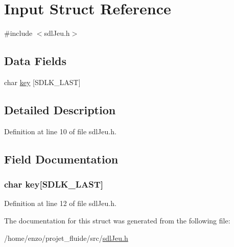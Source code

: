 \hypertarget{struct_input}{\section{Input Struct Reference}
\label{struct_input}
}


{\ttfamily \#include $<$sdl\-Jeu.\-h$>$}

\subsection*{Data Fields}
\begin{DoxyCompactItemize}
\item 
char \hyperlink{struct_input_afc4eabd057bd0061b56de4005f5ecbb8}{key} \mbox{[}S\-D\-L\-K\-\_\-\-L\-A\-S\-T\mbox{]}
\end{DoxyCompactItemize}


\subsection{Detailed Description}


Definition at line 10 of file sdl\-Jeu.\-h.



\subsection{Field Documentation}
\hypertarget{struct_input_afc4eabd057bd0061b56de4005f5ecbb8}{
\subsubsection[{key}]{\setlength{\rightskip}{0pt plus 5cm}char key\mbox{[}S\-D\-L\-K\-\_\-\-L\-A\-S\-T\mbox{]}}}\label{struct_input_afc4eabd057bd0061b56de4005f5ecbb8}


Definition at line 12 of file sdl\-Jeu.\-h.



The documentation for this struct was generated from the following file\-:\begin{DoxyCompactItemize}
\item 
/home/enzo/projet\-\_\-fluide/src/\hyperlink{sdl_jeu_8h}{sdl\-Jeu.\-h}\end{DoxyCompactItemize}
